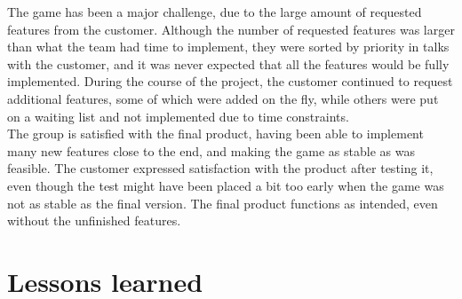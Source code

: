 The game has been a major challenge, due to the large amount of requested features from the customer. Although the number of requested features was larger than what the team had time to implement, they were sorted by priority in talks with the customer, and it was never expected that all the features would be fully implemented. During the course of the project, the customer continued to request additional features, some of which were added on the fly, while others were put on a waiting list and not implemented due to time constraints.\\
\newline
The group is satisfied with the final product, having been able to implement many new features close to the end, and making the game as stable as was feasible. The customer expressed satisfaction with the product after testing it, even though the test might have been placed a bit too early when the game was not as stable as the final version. The final product functions as intended, even without the unfinished features.\\

\section{Lessons learned}

